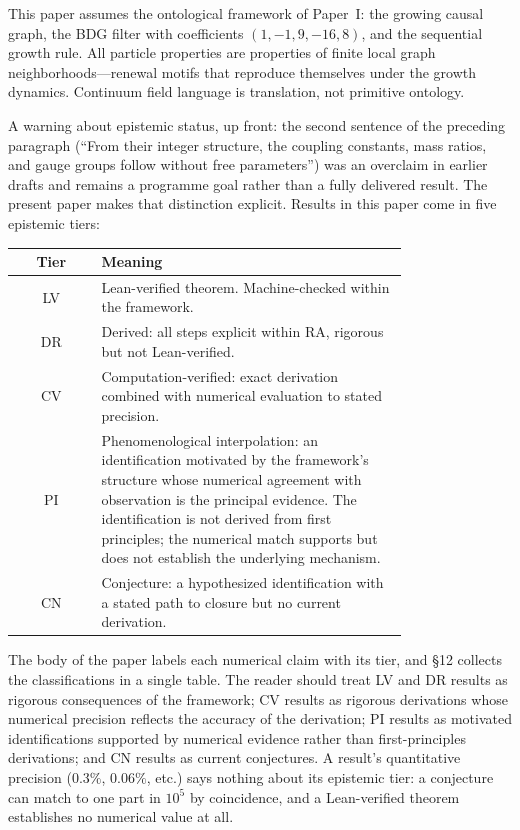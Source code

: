 \documentclass[11pt]{article}
\begin{document}
This paper assumes the ontological framework of Paper~I: the growing causal graph, the BDG filter with coefficients $(1,-1,9,-16,8)$, and the sequential growth rule. All particle properties are properties of finite local graph neighborhoods---renewal motifs that reproduce themselves under the growth dynamics. Continuum field language is translation, not primitive ontology.

A warning about epistemic status, up front: the second sentence of the preceding paragraph (``From their integer structure, the coupling constants, mass ratios, and gauge groups follow without free parameters'') was an overclaim in earlier drafts and remains a programme goal rather than a fully delivered result. The present paper makes that distinction explicit. Results in this paper come in five epistemic tiers:

\begin{center}
\begin{tabular}{cp{0.78\linewidth}}
\toprule
Tier & Meaning \\
\midrule
LV & Lean-verified theorem. Machine-checked within the framework. \\
DR & Derived: all steps explicit within RA, rigorous but not Lean-verified. \\
CV & Computation-verified: exact derivation combined with numerical evaluation to stated precision. \\
PI & Phenomenological interpolation: an identification motivated by the framework's structure whose numerical agreement with observation is the principal evidence. The identification is not derived from first principles; the numerical match supports but does not establish the underlying mechanism. \\
CN & Conjecture: a hypothesized identification with a stated path to closure but no current derivation. \\
\bottomrule
\end{tabular}
\end{center}

The body of the paper labels each numerical claim with its tier, and \S12 collects the classifications in a single table. The reader should treat LV and DR results as rigorous consequences of the framework; CV results as rigorous derivations whose numerical precision reflects the accuracy of the derivation; PI results as motivated identifications supported by numerical evidence rather than first-principles derivations; and CN results as current conjectures. A result's quantitative precision ($0.3\%$, $0.06\%$, etc.) says nothing about its epistemic tier: a conjecture can match to one part in $10^5$ by coincidence, and a Lean-verified theorem establishes no numerical value at all.
\end{document}
